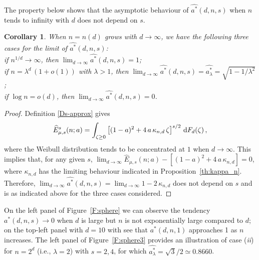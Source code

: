 \documentclass{article}
\def\ml{\lambda}
\newcommand{\vsp} {\vspace{0.3cm}}
\newcommand{\bea}{\begin{eqnarray*}}
\newcommand{\eea}{\end{eqnarray*}}
\def\dd{\mbox{\rm d}}
\newtheorem{corollary}{Corollary}[section]
\begin{document}
\vsp
The property below shows that the asymptotic
behaviour of $\widehat {a^*}(d,n,s)$ when $n$ tends to infinity with $d$ does not depend on $s$.

\begin{corollary}\label{Coro:astar-asymptotic}
When $n=n(d)$ grows with $d\to\infty$, we have the following three cases for the limit of $\widehat {a^*}(d,n,s)$:\\
 if $n^{1/d}\to\infty$, then $\lim_{d\to\infty} \widehat {a^*}(d,n,s) = 1$;\\
 if $n=\ml^d\,(1+o(1))$ with $\ml>1$, then $\lim_{d\to\infty} \widehat {a^*}(d,n,s) = \widehat {a^*_\ml} = \sqrt{1-1/\ml^2}$;\\
 if $\log n = o(d)$, then $\lim_{d\to\infty} \widehat {a^*}(d,n,s) = 0$.
\end{corollary}

\begin{proof}
Definition \eqref{Ds-approx} gives
\bea
\widehat E_{\mu,s}^s(n;a) = \int_{\zeta\geq 0} \left[(1-a)^2 + 4\,a\,\kappa_{n,d}\,\zeta\right]^{s/2}\, \dd F_d(\zeta) \,,
\eea
where the Weibull distribution tends to be concentrated at $1$ when $d\to\infty$. This implies that, for any given $s$, $\lim_{d\to\infty} \widehat E_{\mu,s}(n;a) - [(1-a)^2 + 4\,a\,\kappa_{n,d}]=0$, where $\kappa_{n,d}$ has the limiting behaviour indicated in Proposition~\ref{th:kappa_n}. Therefore,  $\lim_{d\to\infty} \widehat {a^*}(d,n,s) = \lim_{d\to\infty} 1-2\,\kappa_{n,d}$ does not depend on $s$ and is as indicated above for the three cases considered.
\end{proof}

On the left panel of Figure~\ref{F:sphere} we can observe the tendency $a^*(d,n,s)\to 0$ when $d$ is large but $n$ is not exponentially large compared to $d$; on the top-left panel with $d=10$ with see that $a^*(d,n,1)$ approaches 1 as $n$ increases. The left panel of Figure~\ref{F:sphere3} provides an illustration of  case (\textit{ii}) for $n=2^d$ (i.e., $\ml=2$) with $s=2,4$, for which $\widehat {a^*_\ml} = \sqrt{3}/2 \simeq 0.8660$.

\end{document}
